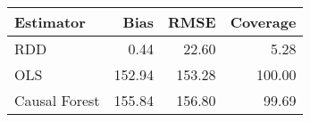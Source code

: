 \begin{table}[ht]
\centering
\begin{tabular}{lrrr}
  \hline
Estimator & Bias & RMSE & Coverage \\ 
  \hline
RDD & 0.44 & 22.60 & 5.28 \\ 
  OLS & 152.94 & 153.28 & 100.00 \\ 
  Causal Forest & 155.84 & 156.80 & 99.69 \\ 
   \hline
\end{tabular}
\end{table}
